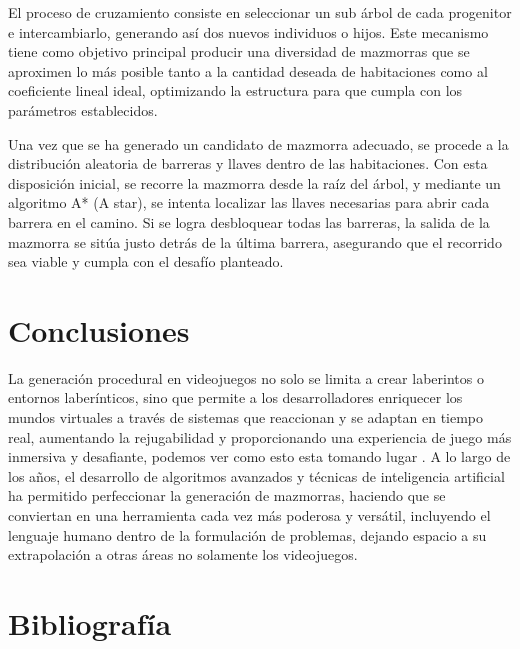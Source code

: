 \documentclass[letter, 10pt]{article}
\begin{document}
El proceso de cruzamiento consiste en seleccionar un sub \'arbol de cada progenitor e intercambiarlo, generando as\'i dos nuevos individuos o hijos. Este mecanismo tiene como objetivo principal producir una diversidad de mazmorras que se aproximen lo m\'as posible tanto a la cantidad deseada de habitaciones como al coeficiente lineal ideal, optimizando la estructura para que cumpla con los par\'ametros establecidos.

Una vez que se ha generado un candidato de mazmorra adecuado, se procede a la distribuci\'on aleatoria de barreras y llaves dentro de las habitaciones. Con esta disposici\'on inicial, se recorre la mazmorra desde la ra\'iz del \'arbol, y mediante un algoritmo A* (A star), se intenta localizar las llaves necesarias para abrir cada barrera en el camino. Si se logra desbloquear todas las barreras, la salida de la mazmorra se sit\'ua justo detr\'as de la \'ultima barrera, asegurando que el recorrido sea viable y cumpla con el desaf\'io planteado.


\section{Conclusiones}

La generaci\'on procedural en videojuegos no solo se limita a crear laberintos o entornos laber\'inticos, sino que permite a los desarrolladores enriquecer los mundos virtuales a trav\'es de sistemas que reaccionan y se adaptan en tiempo real, aumentando la rejugabilidad y proporcionando una experiencia de juego m\'as inmersiva y desafiante, podemos ver como esto esta tomando lugar \cite{7uses}. A lo largo de los a\~nos, el desarrollo de algoritmos avanzados y t\'ecnicas de inteligencia artificial ha permitido perfeccionar la generaci\'on de mazmorras, haciendo que se conviertan en una herramienta cada vez m\'as poderosa y vers\'atil, incluyendo el lenguaje humano dentro de la formulaci\'on de problemas, dejando espacio a su extrapolaci\'on a otras \'areas no solamente los videojuegos.

\section{Bibliograf\'ia}


\end{document}
